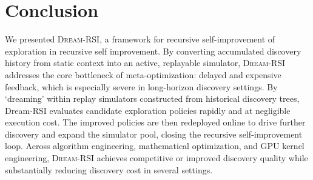 \section{Conclusion}

We presented \textsc{Dream-RSI}, a framework for recursive self-improvement of exploration in recursive self improvement. By converting accumulated discovery history from static context into an active, replayable simulator, \textsc{Dream-RSI} addresses the core bottleneck of meta-optimization: delayed and expensive feedback, which is especially severe in long-horizon discovery settings. By `dreaming' within replay simulators constructed from historical discovery trees, Dream-RSI evaluates candidate exploration policies rapidly and at negligible execution cost. The improved policies are then redeployed online to drive further discovery and expand the simulator pool, closing the recursive self-improvement loop. Across algorithm engineering, mathematical optimization, and GPU kernel engineering, \textsc{Dream-RSI} achieves competitive or improved discovery quality while substantially reducing discovery cost in several settings.